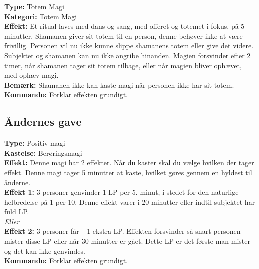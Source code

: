 \begin{orleks arv*}
\textbf{Type:} Totem Magi\\
\textbf{Kategori:} Totem Magi\\
\textbf{Effekt:} Et ritual laves med dans og sang, med offeret og totemet i fokus, på 5 minutter.
Shamanen giver sit totem til en person, denne behøver ikke at være frivillig.
Personen vil nu ikke kunne slippe shamanens totem eller give det videre. Subjektet og shamanen kan nu ikke angribe hinanden. 
Magien forsvinder efter 2 timer, når shamanen tager sit totem tilbage, eller når magien bliver ophævet, med ophæv magi.\\
\textbf{Bemærk:} Shamanen ikke kan kaste magi når personen ikke har sit totem.\\
\textbf{Kommando:} Forklar effekten grundigt.
\end{orleks arv*}

\subsection*{Åndernes gave}

\begin{åndens gave*}
\textbf{Type:} Positiv magi\\
\textbf{Kastelse:} Berøringsmagi\\
\textbf{Effekt:} Denne magi har 2 effekter. Når du kaster skal du vælge hvilken der tager effekt. Denne magi tager 5 minutter at kaste, hvilket gøres gennem en hyldest til ånderne.\\
\textbf{Effekt 1:} 3 personer genvinder 1 LP per 5. minut, i stedet for den naturlige helbredelse på 1 per 10. Denne effekt varer i 20 minutter eller indtil subjektet har fuld LP.\\
\emph{\textit{Eller}}\\
\textbf{Effekt 2:} 3 personer får +1 ekstra LP. Effekten forsvinder så snart personen mister disse LP eller når 30 minutter er gået. Dette LP er det første man mister og det kan ikke genvindes.\\
\textbf{Kommando:} Forklar effekten grundigt.\\
\end{åndens gave*}


